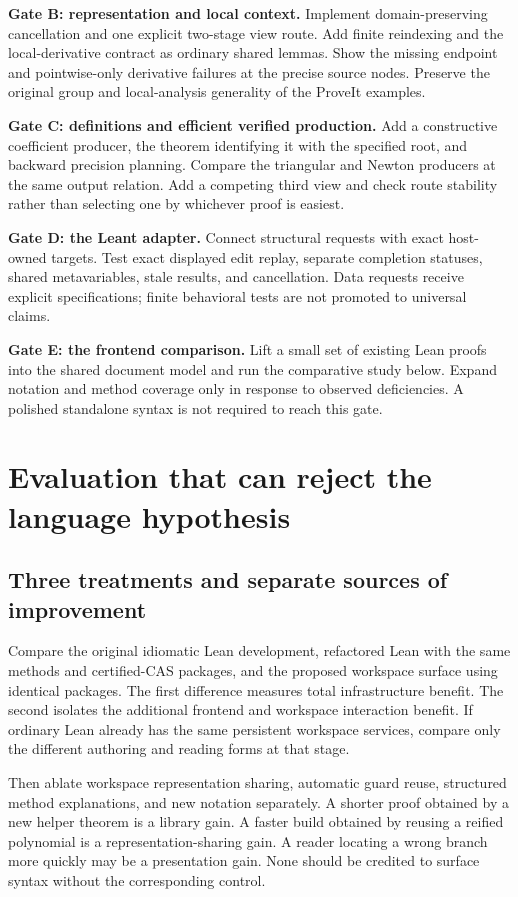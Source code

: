 \documentclass[11pt,letterpaper]{article}
\theoremstyle{definition}
\theoremstyle{remark}
\begin{document}
\textbf{Gate B: representation and local context.}
Implement domain-preserving cancellation and one explicit two-stage view route.
Add finite reindexing and the local-derivative contract as ordinary shared
lemmas. Show the missing endpoint and pointwise-only derivative failures at
the precise source nodes. Preserve the original group and local-analysis
generality of the ProveIt examples.

\textbf{Gate C: definitions and efficient verified production.}
Add a constructive coefficient producer, the theorem identifying it with the
specified root, and backward precision planning. Compare the triangular and
Newton producers at the same output relation. Add a competing third view and
check route stability rather than selecting one by whichever proof is easiest.

\textbf{Gate D: the Leant adapter.}
Connect structural requests with exact host-owned targets. Test exact displayed
edit replay, separate completion statuses, shared metavariables, stale results,
and cancellation. Data requests receive explicit specifications; finite behavioral
tests are not promoted to universal claims.

\textbf{Gate E: the frontend comparison.}
Lift a small set of existing Lean proofs into the shared document model and run
the comparative study below. Expand notation and method coverage only in
response to observed deficiencies. A polished standalone syntax is not required
to reach this gate.

\section{Evaluation that can reject the language hypothesis}
\label{sec:evaluation}

\subsection{Three treatments and separate sources of improvement}
Compare the original idiomatic Lean development, refactored Lean with the same
methods and certified-CAS packages, and the proposed workspace surface using
identical packages. The first difference measures total infrastructure benefit.
The second isolates the additional frontend and workspace interaction benefit.
If ordinary Lean already has the same persistent workspace services, compare
only the different authoring and reading forms at that stage.

Then ablate workspace representation sharing, automatic guard reuse, structured
method explanations, and new notation separately. A shorter proof obtained by
a new helper theorem is a library gain. A faster build obtained by reusing a
reified polynomial is a representation-sharing gain. A reader locating a wrong
branch more quickly may be a presentation gain. None should be credited to
surface syntax without the corresponding control.
\end{document}
